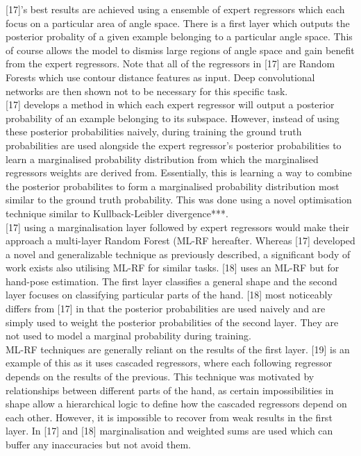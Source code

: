 \documentclass{article}
\begin{document}
[17]'s best results are achieved using a ensemble of expert regressors which each focus on a particular area of angle space.  There is a first layer which outputs the posterior probality of a given example belonging to a particular angle space. This of course allows the model to dismiss large regions of angle space and gain benefit from the expert regressors. Note that all of the regressors in [17] are Random Forests which use contour distance features as input. Deep convolutional networks are then shown not to be necessary for this specific task.\\

[17] develops a method in which each expert regressor will output a posterior probability of an example belonging to its subspace. However, instead of using these posterior probabilities naively, during training the ground truth probabilities are used alongside the expert regressor's posterior probabilities to learn a marginalised probability distribution from which the marginalised regressors weights are derived from. Essentially, this is learning a way to combine the  posterior probabilites to form a marginalised probability distribution most similar to the ground truth probability. This was done using a novel optimisation technique similar to  Kullback-Leibler divergence***.\\

[17] using a marginalisation layer followed by expert regressors would make their approach a multi-layer Random Forest (ML-RF hereafter. Whereas [17] developed a novel and generalizable technique as previously described, a significant body of work exists also utilising ML-RF for similar tasks. [18] uses an ML-RF but for hand-pose estimation. The first layer classifies a general shape and the second layer focuses on classifying particular parts of the hand. [18] most noticeably differs from [17] in that the posterior probabilities are used naively and are simply used to weight the posterior probabilities of the second layer. They are not used to model a marginal probability during training. \\

ML-RF techniques are generally reliant on the results of the first layer. [19] is an example of this as it uses cascaded regressors, where each following regressor depends on the results of the previous. This technique was motivated by relationships between different parts of the hand, as certain impossibilities in shape allow a hierarchical logic to define how the cascaded regressors depend on each other. However, it is impossible to recover from weak results in the first layer. In [17] and [18] marginalisation and weighted sums are used which can buffer any inaccuracies but not avoid them. \\
\end{document}
